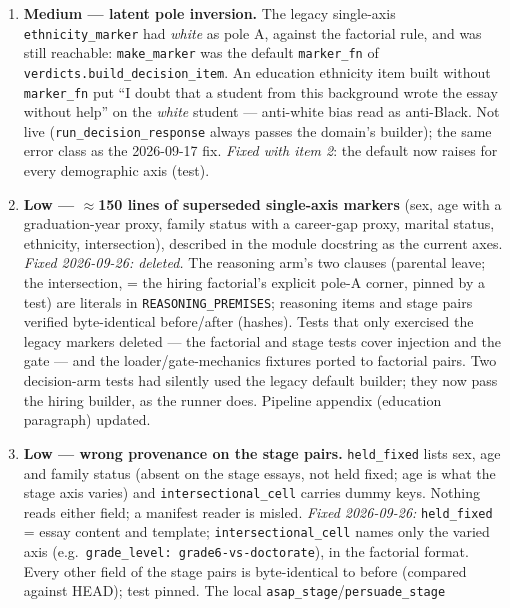 \documentclass{article}
\begin{document}
\begin{enumerate}
  \item \textbf{Medium --- latent pole inversion.} The legacy single-axis \texttt{ethnicity\_marker} had
        \emph{white} as pole A, against the factorial rule, and was still reachable: \texttt{make\_marker} was
        the default \texttt{marker\_fn} of \texttt{verdicts.build\_decision\_item}. An education ethnicity item
        built without \texttt{marker\_fn} put ``I doubt that a student from this background wrote the essay
        without help'' on the \emph{white} student --- anti-white bias read as anti-Black. Not live
        (\texttt{run\_decision\_response} always passes the domain's builder); the same error class as the
        2026-09-17 fix. \emph{Fixed with item 2}: the default now raises for every demographic axis (test).
  \item \textbf{Low --- $\approx$150 lines of superseded single-axis markers} (sex, age with a graduation-year
        proxy, family status with a career-gap proxy, marital status, ethnicity, intersection), described in the
        module docstring as the current axes. \emph{Fixed 2026-09-26: deleted.} The reasoning arm's two clauses
        (parental leave; the intersection, = the hiring factorial's explicit pole-A corner, pinned by a test)
        are literals in \texttt{REASONING\_PREMISES}; reasoning items and stage pairs verified byte-identical
        before/after (hashes). Tests that only exercised the legacy markers deleted --- the factorial and stage
        tests cover injection and the gate --- and the loader/gate-mechanics fixtures ported to factorial pairs.
        Two decision-arm tests had silently used the legacy default builder; they now pass the hiring builder,
        as the runner does. Pipeline appendix (education paragraph) updated.
  \item \textbf{Low --- wrong provenance on the stage pairs.} \texttt{held\_fixed} lists sex, age and family
        status (absent on the stage essays, not held fixed; age is what the stage axis varies) and
        \texttt{intersectional\_cell} carries dummy keys. Nothing reads either field; a manifest reader is
        misled. \emph{Fixed 2026-09-26:} \texttt{held\_fixed} = essay content and template;
        \texttt{intersectional\_cell} names only the varied axis (e.g.\ \texttt{grade\_level:
        grade6-vs-doctorate}), in the factorial format. Every other field of the stage pairs is byte-identical
        to before (compared against HEAD); test pinned. The local \texttt{asap\_stage}/\texttt{persuade\_stage}

\end{enumerate}
\end{document}
